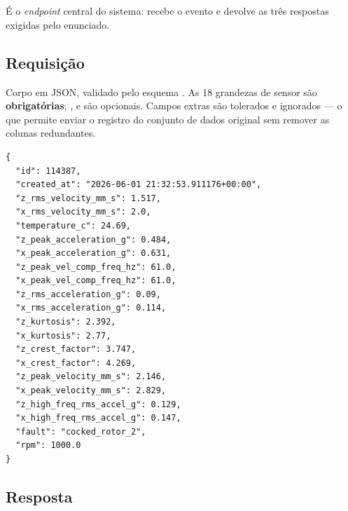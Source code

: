 \section{}

É o \textit{endpoint} central do sistema: recebe o evento e devolve as três
respostas exigidas pelo enunciado.

\subsection{Requisição}

Corpo em JSON, validado pelo esquema . As 18 grandezas de sensor
são \textbf{obrigatórias}; ,  e  são
opcionais. Campos extras são tolerados e ignorados --- o que permite enviar o
registro do conjunto de dados original sem remover as colunas redundantes.

\begin{lstlisting}[language=jsonpmx, caption={Requisição --- evento de exemplo do enunciado}, label={lst:reqdiag}]
{
  "id": 114387,
  "created_at": "2026-06-01 21:32:53.911176+00:00",
  "z_rms_velocity_mm_s": 1.517,
  "x_rms_velocity_mm_s": 2.0,
  "temperature_c": 24.69,
  "z_peak_acceleration_g": 0.484,
  "x_peak_acceleration_g": 0.631,
  "z_peak_vel_comp_freq_hz": 61.0,
  "x_peak_vel_comp_freq_hz": 61.0,
  "z_rms_acceleration_g": 0.09,
  "x_rms_acceleration_g": 0.114,
  "z_kurtosis": 2.392,
  "x_kurtosis": 2.77,
  "z_crest_factor": 3.747,
  "x_crest_factor": 4.269,
  "z_peak_velocity_mm_s": 2.146,
  "x_peak_velocity_mm_s": 2.829,
  "z_high_freq_rms_accel_g": 0.129,
  "x_high_freq_rms_accel_g": 0.147,
  "fault": "cocked_rotor_2",
  "rpm": 1000.0
}
\end{lstlisting}

\subsection{Resposta}

